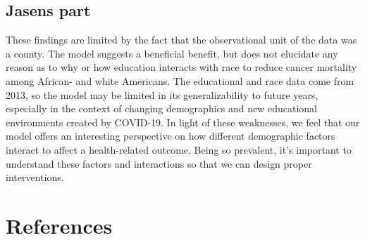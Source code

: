 \documentclass[
  11pt,
]{article}
\begin{document}
\hypertarget{jasens-part}{%
\subsection{Jasens part}\label{jasens-part}}

These findings are limited by the fact that the observational unit of
the data was a county. The model suggests a beneficial benefit, but does
not elucidate any reason as to why or how education interacts with race
to reduce cancer mortality among African- and white Americans. The
educational and race data come from 2013, so the model may be limited in
its generalizability to future years, especially in the context of
changing demographics and new educational environments created by
COVID-19. In light of these weaknesses, we feel that our model offers an
interesting perspective on how different demographic factors interact to
affect a health-related outcome. Being so prevalent, it's important to
understand these factors and interactions so that we can design proper
interventions.

\pagebreak

\hypertarget{references}{%
\section{References}\label{references}}
\end{document}
